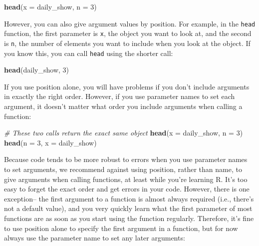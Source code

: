 \documentclass[]{book}
\makeatletter
\newenvironment{Shaded}{\begin{snugshade}}{\end{snugshade}}
\newcommand{\KeywordTok}[1]{\textcolor[rgb]{0.13,0.29,0.53}{\textbf{#1}}}
\newcommand{\DataTypeTok}[1]{\textcolor[rgb]{0.13,0.29,0.53}{#1}}
\newcommand{\DecValTok}[1]{\textcolor[rgb]{0.00,0.00,0.81}{#1}}
\newcommand{\CommentTok}[1]{\textcolor[rgb]{0.56,0.35,0.01}{\textit{#1}}}
\newcommand{\NormalTok}[1]{#1}
\newenvironment{kframe}{%
\medskip{}
\setlength{\fboxsep}{.8em}
 \def\at@end@of@kframe{}%
 \ifinner\ifhmode%
  \def\at@end@of@kframe{\end{minipage}}%
  \begin{minipage}{\columnwidth}%
 \fi\fi%
 \def\FrameCommand##1{\hskip\@totalleftmargin \hskip-\fboxsep
 \colorbox{shadecolor}{##1}\hskip-\fboxsep
     \hskip-\linewidth \hskip-\@totalleftmargin \hskip\columnwidth}%
 \MakeFramed {\advance\hsize-\width
   \@totalleftmargin\z@ \linewidth\hsize
   \@setminipage}}%
 {\par\unskip\endMakeFramed%
 \at@end@of@kframe}
\renewenvironment{Shaded}{\begin{kframe}}{\end{kframe}}
\theoremstyle{definition}
\theoremstyle{definition}
\theoremstyle{definition}
\theoremstyle{remark}
\makeatother
\begin{document}
\begin{Shaded}
\begin{Highlighting}[]
\KeywordTok{head}\NormalTok{(}\DataTypeTok{x =}\NormalTok{ daily_show, }\DataTypeTok{n =} \DecValTok{3}\NormalTok{)}
\end{Highlighting}
\end{Shaded}

However, you can also give argument values by position. For example, in
the \texttt{head} function, the first parameter is \texttt{x}, the
object you want to look at, and the second is \texttt{n}, the number of
elements you want to include when you look at the object. If you know
this, you can call \texttt{head} using the shorter call:

\begin{Shaded}
\begin{Highlighting}[]
\KeywordTok{head}\NormalTok{(daily_show, }\DecValTok{3}\NormalTok{)}
\end{Highlighting}
\end{Shaded}

If you use position alone, you will have problems if you don't include
arguments in exactly the right order. However, if you use parameter
names to set each argument, it doesn't matter what order you include
arguments when calling a function:

\begin{Shaded}
\begin{Highlighting}[]
\CommentTok{# These two calls return the exact same object}
\KeywordTok{head}\NormalTok{(}\DataTypeTok{x =}\NormalTok{ daily_show, }\DataTypeTok{n =} \DecValTok{3}\NormalTok{)}
\KeywordTok{head}\NormalTok{(}\DataTypeTok{n =} \DecValTok{3}\NormalTok{, }\DataTypeTok{x =}\NormalTok{ daily_show)}
\end{Highlighting}
\end{Shaded}

Because code tends to be more robust to errors when you use parameter
names to set arguments, we recommend against using position, rather than
name, to give arguments when calling functions, at least while you're
learning R. It's too easy to forget the exact order and get errors in
your code. However, there is one exception-- the first argument to a
function is almost always required (i.e., there's not a default value),
and you very quickly learn what the first parameter of most functions
are as soon as you start using the function regularly. Therefore, it's
fine to use position alone to specify the first argument in a function,
but for now always use the parameter name to set any later arguments:
\end{document}
